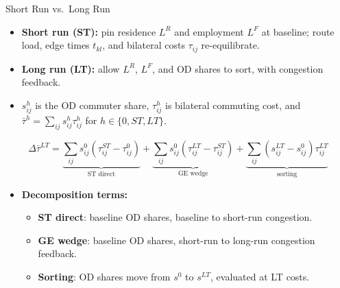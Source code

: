 \documentclass[11pt,aspectratio=169]{beamer}
\begin{document}
\begin{frame}{Short Run vs.\ Long Run}
\small
\begin{itemize}
  \item \textbf{Short run (ST):} pin residence $L^R$ and employment $L^F$ at baseline; route load, edge times $t_{kl}$, and bilateral costs $\tau_{ij}$ re-equilibrate.
  \item \textbf{Long run (LT):} allow $L^R$, $L^F$, and OD shares to sort, with congestion feedback.
  \item $s_{ij}^h$ is the OD commuter share, $\tau_{ij}^h$ is bilateral commuting cost, and $\bar\tau^h=\sum_{ij}s_{ij}^h\tau_{ij}^h$ for $h\in\{0,ST,LT\}$.
\end{itemize}
\vspace{-0.5em}
{\footnotesize
  \begin{equation}
    \Delta\bar\tau^{LT}=
    \underbrace{\textstyle\sum_{ij}s_{ij}^0(\tau_{ij}^{ST}\!-\tau_{ij}^0)}_{\text{ST direct}}
    +\underbrace{\textstyle\sum_{ij}s_{ij}^0(\tau_{ij}^{LT}\!-\tau_{ij}^{ST})}_{\text{GE wedge}}
    +\underbrace{\textstyle\sum_{ij}(s_{ij}^{LT}\!-s_{ij}^0)\tau_{ij}^{LT}}_{\text{sorting}}
  \end{equation}
}
\vspace{-1.0em}
\begin{itemize}\footnotesize
  \item \textbf{Decomposition terms:}
  \begin{itemize}\scriptsize
    \item \textbf{ST direct}: baseline OD shares, baseline to short-run congestion.
    \item \textbf{GE wedge}: baseline OD shares, short-run to long-run congestion feedback.
    \item \textbf{Sorting}: OD shares move from $s^0$ to $s^{LT}$, evaluated at LT costs.
  \end{itemize}
\end{itemize}
\end{frame}
\end{document}

